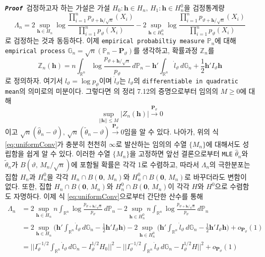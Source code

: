 \documentclass[10pt,onecolumn,twoside,a4size]{gsag3jnl}
\newcommand{\proof}{\texttt{\textit{\textbf{Proof }}}}
\begin{document}
\proof 검정하고자 하는 가설은 가설 $H_0:\mathbf{h}\in H_n,\,H_1:\mathbf{h}\in H_n^0$을 검정통계량
\begin{equation}
  \Lambda_n=2\sup_{\mathbf{h}\in H_n}\log\frac{\prod_{i=1}^np_{\vartheta+\mathbf{h}/\sqrt{n}}(X_i)}{\prod_{i=1}^np_{\vartheta}(X_i)}-2\sup_{\mathbf{h}\in H_n^0}\log\frac{\prod_{i=1}^np_{\vartheta+\mathbf{h}/\sqrt{n}}(X_i)}{\prod_{i=1}^np_{\vartheta}(X_i)}
\end{equation}
로 검정하는 것과 동등하다. 이제 \texttt{empirical probabiltiy measure} $\mathbb{P}_n$에 대해 \texttt{empirical process} $\mathbb{G}_n=\sqrt{n}(\mathbb{P}_n-\mathbf{P}_\vartheta)$를 생각하고, 확률과정 $\mathbb{Z}_n$를
\begin{equation}
  \mathbb{Z}_n(\mathbf{h})=n\int_{\mathbb{R}^n}\log\frac{p_{\vartheta+\mathbf{h}/\sqrt{n}}}{p_{\vartheta}}\,d\mathbb{P}_n-\mathbf{h}'\int_{\mathbb{R}^n}\dot{l}_\vartheta\,d\mathbb{G}_n+\frac{1}{2}\mathbf{h}'I_\vartheta\mathbf{h}
\end{equation}
로 정의하자. 여기서 $l_\vartheta=\log p_\vartheta$이며 $\dot{l}_\vartheta$는 $l_\vartheta$의 \texttt{differentiable in quadratic mean}의 의미로의 미분이다. 그렇다면 \texttt{\cite{van2000asymptotic}}의 정리 7.12의 증명으로부터 임의의 $M\geq0$에 대해
\begin{equation}\label{eq:uniformConv}
  \sup_{||\mathbf{h}||\leq M}|Z_n(\mathbf{h})|\stackrel{\mathbf{P}_\vartheta}{\to}0
\end{equation}이고 $\sqrt{n}(\widehat{\theta}_n-\vartheta),\,\sqrt{n}(\widetilde{\theta}_n-\vartheta)\stackrel{\mathbf{P}_\vartheta}{\to}0$임을 알 수 있다. 나아가, 위의 식 \ref{eq:uniformConv}가 충분히 천천히 $\infty$로 발산하는 임의의 수열 $\{M_n\}$에 대해서도 성립함을 쉽게 알 수 있다. 이러한 수열 $\{M_n\}$을 고정하면 앞선 결론으로부터 \texttt{MLE} $\widehat{\theta}_n$와 $\widetilde{\theta}_n$가 $B(\vartheta,\,M_n/\sqrt{n})$에 포함될 확률은 각각 1로 수렴하고, 따라서 $\Lambda_n$의 극한분포는 집합 $H_n$과 $H_n^0$을 각각 $H_n\cap B(\mathbf{0},\,M_n)$와 $H_n^0\cap B(\mathbf{0},\,M_n)$로 바꾸더라도 변함이 없다. 또한, 집합 $H_n\cap B(\mathbf{0},\,M_n)$와 $H_n^0\cap B(\mathbf{0},\,M_n)$이 각각 $H$와 $H^0$으로 수렴함도 자명하다. 이제 식 \ref{eq:uniformConv}으로부터 간단한 산수를 통해
\begin{align}
  \Lambda_n&=2\sup_{\mathbf{h}\in H_n}n\int_{\mathbb{R}^n}\log\frac{p_{\vartheta+\mathbf{h}/\sqrt{n}}}{p_{\vartheta}}\,d\mathbb{P}_n-2\sup_{\mathbf{h}\in H_n^0}n\int_{\mathbb{R}^n}\log\frac{p_{\vartheta+\mathbf{h}/\sqrt{n}}}{p_{\vartheta}}\,d\mathbb{P}_n\\
  &=2\sup_{\mathbf{h}\in H_n}\bigg(\mathbf{h}'\int_{\mathbb{R}^n}\dot{l}_\vartheta\,d\mathbb{G}_n-\frac{1}{2}\mathbf{h}'I_\vartheta\mathbf{h}\bigg)-2\sup_{\mathbf{h}\in H_n^0}\bigg(\mathbf{h}'\int_{\mathbb{R}^n}\dot{l}_\vartheta\,d\mathbb{G}_n-\frac{1}{2}\mathbf{h}'I_\vartheta\mathbf{h}\bigg)+o_{\mathbf{P}_\vartheta}(1)\nonumber\\
  &=\bigg|\bigg|I_\vartheta^{-1/2}\int_{\mathbb{R}^n}\dot{l}_\vartheta\,d\mathbb{G}_n-I_\vartheta^{1/2}H_0\bigg|\bigg|^2-\bigg|\bigg|I_\vartheta^{-1/2}\int_{\mathbb{R}^n}\dot{l}_\vartheta\,d\mathbb{G}_n-I_\vartheta^{1/2}H\bigg|\bigg|^2+o_{\mathbf{P}_\vartheta}(1)\nonumber
\end{align}
\end{document}
